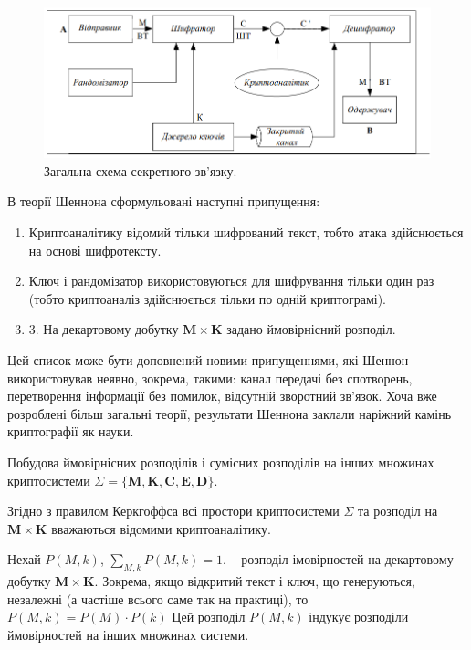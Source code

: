 \begin{figure}
    \centering
    \includegraphics[width=0.5\linewidth]{Images/Secret_comunication_general_scheme.png}
    \caption{Загальна схема секретного зв'язку.}
    \label{fig:enter-label}
\end{figure}

В теорії Шеннона сформульовані наступні припущення:
\begin{enumerate}
    \item Криптоаналітику відомий тільки шифрований текст, тобто атака здійснюється на основі шифротексту.
    \item Ключ і рандомізатор використовуються для шифрування тільки один раз (тобто криптоаналіз здійснюється тільки по одній криптограмі).
    \item 3. На декартовому добутку $\mathbf{M} \times \mathbf{K}$ задано ймовірнісний розподіл.
\end{enumerate}

Цей список може бути доповнений новими припущеннями, які Шеннон
використовував неявно, зокрема, такими: канал передачі без спотворень,
перетворення інформації без помилок, відсутній зворотний зв’язок. Хоча вже
розроблені більш загальні теорії, результати Шеннона заклали наріжний камінь
криптографії як науки.

Побудова ймовірнісних розподілів і сумісних розподілів на інших множинах криптосистеми $\Sigma = \{\mathbf{M}, \mathbf{K}, \mathbf{C}, \mathbf{E}, \mathbf{D}\}$.

Згідно з правилом Керкгоффса всі простори криптосистеми $\Sigma$ та розподіл на $\mathbf{M} \times \mathbf{K}$ вважаються відомими криптоаналітику.

Нехай $P(M, k)$, $\sum\limits_{M, k} P(M, k) = 1$. -- розподіл імовірностей на декартовому
добутку $\mathbf{M} \times \mathbf{K}$. Зокрема, якщо відкритий текст і ключ, що генеруються,
незалежні (а частіше всього саме так на практиці), то $P(M, k) = P(M) \cdot P(k)$
Цей розподіл $P(M, k)$ індукує розподіли ймовірностей на інших множинах
системи.

